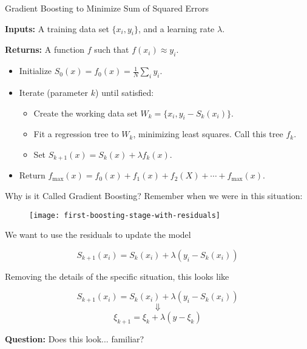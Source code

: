 \begin{frame}{Gradient Boosting to Minimize Sum of Squared Errors}

\textbf{Inputs:} A training data set $\{ x_i, y_i \}$, and a learning rate $\lambda$.

\textbf{Returns:} A function $f$ such that $f(x_i) \approx y_i$.

\begin{itemize}
  \item Initialize $S_0(x) = f_0(x) = \frac{1}{N} \sum_i y_i$.
  \item Iterate (parameter $k$) until satisfied: \begin{itemize}
    \item Create the working data set $W_k = \{ x_i, y_i - S_{k}(x_i) \}$.
    \item Fit a regression tree to $W_k$, minimizing least squares.  Call this tree $f_k$.
    \item Set $S_{k+1}(x) = S_{k}(x) + \lambda f_{k}(x)$. 
  \end{itemize}
  \item Return $f_{\text{max}}(x) = f_0(x) + f_1(x) + f_2(X) + \cdots + f_{\text{max}}(x)$.
\end{itemize}

\end{frame}
%

\begin{frame}{Why is it Called Gradient Boosting?}
Remember when we were in this situation:

  \begin{figure}
    \texttt{[image: first-boosting-stage-with-residuals]}
  \end{figure}
  
We want to use the residuals to update the model

$$ S_{k+1}(x_i) = S_{k}(x_i) + \lambda (y_i - S_{k}(x_i)) $$

\end{frame}
%

\begin{frame}
Removing the details of the specific situation, this looks like

$$ S_{k+1}(x_i) = S_{k}(x_i) + \lambda (y_i - S_{k}(x_i)) $$
$$ \Downarrow $$
$$ \xi_{k+1} = \xi_k + \lambda (y - \xi_k) $$

\textbf{Question:} Does this look... familiar?
\end{frame}
%

